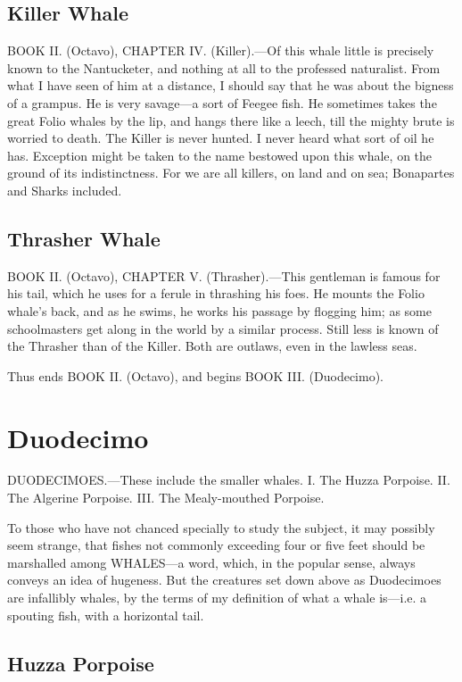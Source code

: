 \subsection{Killer Whale}

BOOK II. (Octavo), CHAPTER IV. (Killer).—Of this whale little is precisely known to the Nantucketer, and nothing at all to the professed naturalist. From what I have seen of him at a distance, I should say that he was about the bigness of a grampus. He is very savage—a sort of Feegee fish. He sometimes takes the great Folio whales by the lip, and hangs there like a leech, till the mighty brute is worried to death. The Killer is never hunted. I never heard what sort of oil he has. Exception might be taken to the name bestowed upon this whale, on the ground of its indistinctness. For we are all killers, on land and on sea; Bonapartes and Sharks included.

\subsection{Thrasher Whale}

BOOK II. (Octavo), CHAPTER V. (Thrasher).—This gentleman is famous for his tail, which he uses for a ferule in thrashing his foes. He mounts the Folio whale’s back, and as he swims, he works his passage by flogging him; as some schoolmasters get along in the world by a similar process. Still less is known of the Thrasher than of the Killer. Both are outlaws, even in the lawless seas.

Thus ends BOOK II. (Octavo), and begins BOOK III. (Duodecimo).

\section{Duodecimo}

DUODECIMOES.—These include the smaller whales. I. The Huzza Porpoise. II. The Algerine Porpoise. III. The Mealy-mouthed Porpoise.

To those who have not chanced specially to study the subject, it may possibly seem strange, that fishes not commonly exceeding four or five feet should be marshalled among WHALES—a word, which, in the popular sense, always conveys an idea of hugeness. But the creatures set down above as Duodecimoes are infallibly whales, by the terms of my definition of what a whale is—i.e. a spouting fish, with a horizontal tail.

\subsection{Huzza Porpoise}

